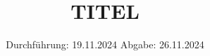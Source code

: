 

\subject{V203}
\title{TITEL}
\date{%
  Durchführung: 19.11.2024
  \hspace{3em}
  Abgabe: 26.11.2024
}



\maketitle
\thispagestyle{empty}
\tableofcontents
\newpage






\printbibliography{}


